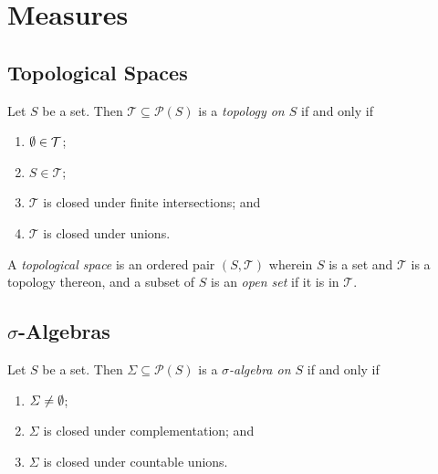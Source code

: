 



\section{Measures}


\subsection{Topological Spaces}

\Bdf
  Let \(S\) be a set. Then \(\mathcal{T} \subseteq \mathcal{P}(S)\) is a \emph{topology on \(S\)} if and only if
  \begin{enumerate}
    \item \(\emptyset \in \mathcal{T}\);
    \item \(S \in \mathcal{T}\);
    \item \(\mathcal{T}\) is closed under finite intersections; and
    \item \(\mathcal{T}\) is closed under unions.
  \end{enumerate}

  A \emph{topological space} is an ordered pair \((S, \mathcal{T})\) wherein \(S\) is a set and \(\mathcal{T}\) is a
  topology thereon, and a subset of \(S\) is an \emph{open set} if it is in \(\mathcal{T}\).
\Edf

\subsection{\texorpdfstring{\(\sigma\)}{Sigma}-Algebras}

\Bdf
  Let \(S\) be a set. Then \(\varSigma \subseteq \mathcal{P}(S)\) is a \emph{\(\sigma\)-algebra on \(S\)} if and only if
  \begin{enumerate}
    \item \(\varSigma \ne \emptyset\);
    \item \(\varSigma\) is closed under complementation; and
    \item \(\varSigma\) is closed under countable unions.
  \end{enumerate}

